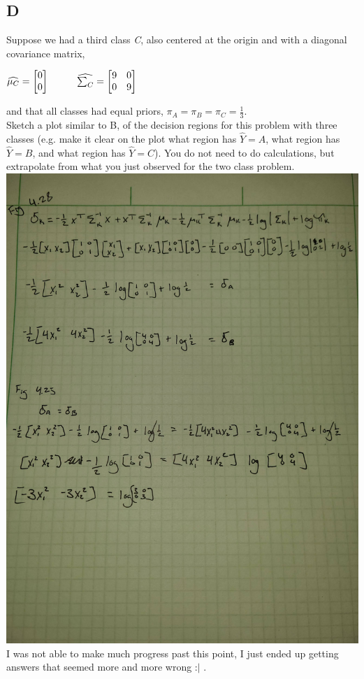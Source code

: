 \documentclass[12pt]{article}
\newcommand\tab[1][1cm]{\hspace*{#1}}
\begin{document}
\subsection{D}
Suppose we had a third class \emph{C}, also centered at the origin and with a diagonal covariance matrix,
\begin{center}
    $\widehat{\mu_C} = \begin{bmatrix}
            0 \\
            0
        \end{bmatrix}
        \tab
        \widehat{\sum_C} = \begin{bmatrix}
            9 & 0 \\
            0 & 9
        \end{bmatrix}
    $
\end{center}
and that all classes had equal priors, $\pi_A = \pi_B = \pi_C = \frac{1}{3}$.\\
Sketch a plot similar to B, of the decision regions for this problem with three classes (e.g. make it clear on the plot what region has $\hat{Y} = A$, what region has $\hat{Y} = B$, and what region has $\hat{Y} = C$). You do not need to do calculations, but extrapolate from what you just observed for the two class problem.\\
\includegraphics[width=1\textwidth]{q3_progress.jpg}\\
I was not able to make much progress past this point, I just ended up getting answers that seemed more and more wrong :$|$ .
\end{document}
